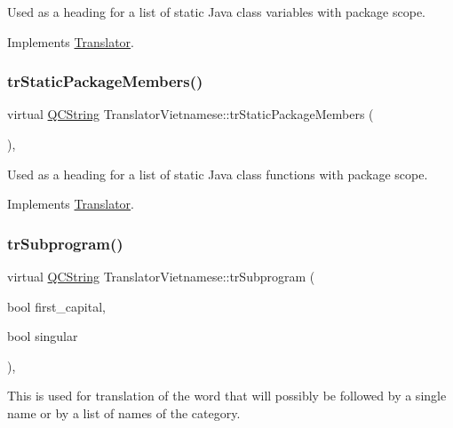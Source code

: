 Used as a heading for a list of static Java class variables with package scope. 

Implements \mbox{\hyperlink{class_translator}{Translator}}.

\mbox{\label{class_translator_vietnamese_a71ca49d89fe741faf2e568cb9aaa474d}} 
\subsubsection{\texorpdfstring{trStaticPackageMembers()}{trStaticPackageMembers()}}
{\footnotesize\ttfamily virtual \mbox{\hyperlink{class_q_c_string}{Q\+C\+String}} Translator\+Vietnamese\+::tr\+Static\+Package\+Members (\begin{DoxyParamCaption}{ }\end{DoxyParamCaption})\hspace{0.3cm}{\ttfamily [inline]}, {\ttfamily [virtual]}}

Used as a heading for a list of static Java class functions with package scope. 

Implements \mbox{\hyperlink{class_translator}{Translator}}.

\mbox{\label{class_translator_vietnamese_a49e7db7f5dfd5402a3b89c78146df255}} 
\subsubsection{\texorpdfstring{trSubprogram()}{trSubprogram()}}
{\footnotesize\ttfamily virtual \mbox{\hyperlink{class_q_c_string}{Q\+C\+String}} Translator\+Vietnamese\+::tr\+Subprogram (\begin{DoxyParamCaption}\item[{bool}]{first\+\_\+capital,  }\item[{bool}]{singular }\end{DoxyParamCaption})\hspace{0.3cm}{\ttfamily [inline]}, {\ttfamily [virtual]}}

This is used for translation of the word that will possibly be followed by a single name or by a list of names of the category. 

